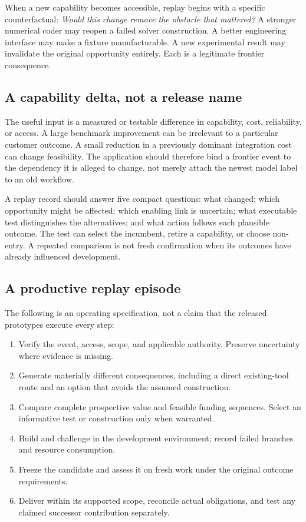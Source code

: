 \documentclass[11pt,letterpaper]{article}
\theoremstyle{remark}\newtheorem{remark}{Remark}[section]
\begin{document}
When a new capability becomes accessible, replay begins with a specific counterfactual: \emph{Would this change remove the obstacle that mattered?} A stronger numerical coder may reopen a failed solver construction. A better engineering interface may make a fixture manufacturable. A new experimental result may invalidate the original opportunity entirely. Each is a legitimate frontier consequence.

\subsection{A capability delta, not a release name}
The useful input is a measured or testable difference in capability, cost, reliability, or access. A large benchmark improvement can be irrelevant to a particular customer outcome. A small reduction in a previously dominant integration cost can change feasibility. The application should therefore bind a frontier event to the dependency it is alleged to change, not merely attach the newest model label to an old workflow.

A replay record should answer five compact questions: what changed; which opportunity might be affected; which enabling link is uncertain; what executable test distinguishes the alternatives; and what action follows each plausible outcome. The test can select the incumbent, retire a capability, or choose non-entry. A repeated comparison is not fresh confirmation when its outcomes have already influenced development.

\subsection{A productive replay episode}
The following is an operating specification, not a claim that the released prototypes execute every step:
\begin{enumerate}
\item Verify the event, access, scope, and applicable authority. Preserve uncertainty where evidence is missing.
\item Generate materially different consequences, including a direct existing-tool route and an option that avoids the assumed construction.
\item Compare complete prospective value and feasible funding sequences. Select an informative test or construction only when warranted.
\item Build and challenge in the development environment; record failed branches and resource consumption.
\item Freeze the candidate and assess it on fresh work under the original outcome requirements.
\item Deliver within its supported scope, reconcile actual obligations, and test any claimed successor contribution separately.
\end{enumerate}
\end{document}
